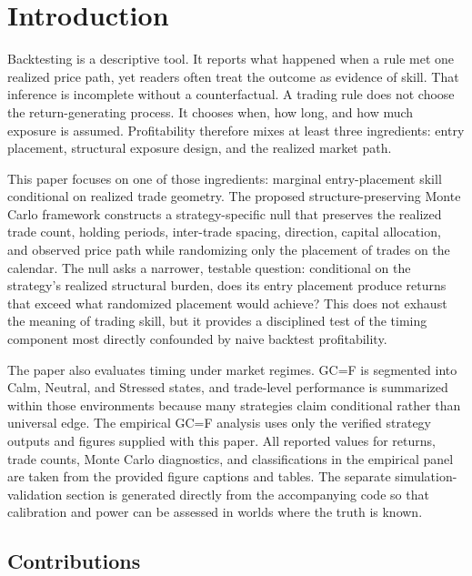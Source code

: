 \documentclass[preprint,12pt]{elsarticle}
\theoremstyle{definition}
\begin{document}
\section{Introduction}

Backtesting is a descriptive tool. It reports what happened when a rule met one realized price path, yet readers often treat the outcome as evidence of skill. That inference is incomplete without a counterfactual. A trading rule does not choose the return-generating process. It chooses when, how long, and how much exposure is assumed. Profitability therefore mixes at least three ingredients: entry placement, structural exposure design, and the realized market path.

This paper focuses on one of those ingredients: marginal entry-placement skill conditional on realized trade geometry. The proposed structure-preserving Monte Carlo framework constructs a strategy-specific null that preserves the realized trade count, holding periods, inter-trade spacing, direction, capital allocation, and observed price path while randomizing only the placement of trades on the calendar. The null asks a narrower, testable question: conditional on the strategy's realized structural burden, does its entry placement produce returns that exceed what randomized placement would achieve? This does not exhaust the meaning of trading skill, but it provides a disciplined test of the timing component most directly confounded by naive backtest profitability.

The paper also evaluates timing under market regimes. GC=F is segmented into Calm, Neutral, and Stressed states, and trade-level performance is summarized within those environments because many strategies claim conditional rather than universal edge. The empirical GC=F analysis uses only the verified strategy outputs and figures supplied with this paper. All reported values for returns, trade counts, Monte Carlo diagnostics, and classifications in the empirical panel are taken from the provided figure captions and tables. The separate simulation-validation section is generated directly from the accompanying code so that calibration and power can be assessed in worlds where the truth is known.

\subsection{Contributions}
\end{document}
